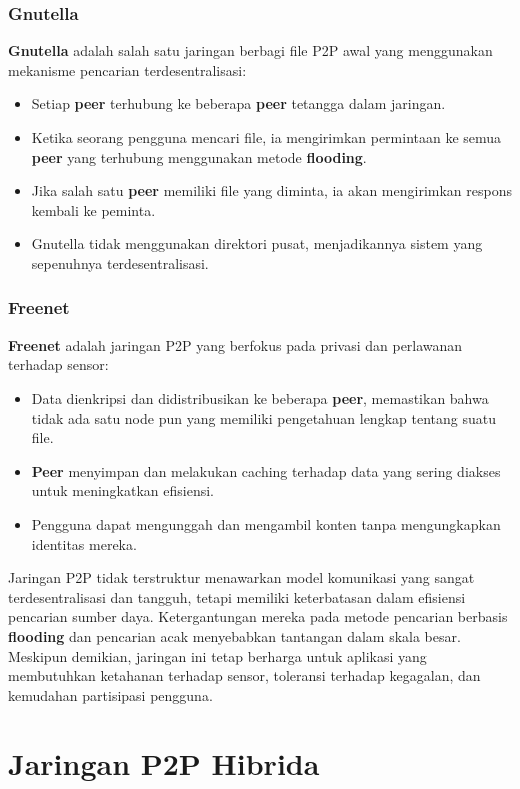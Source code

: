 \subsubsection{Gnutella}
\textbf{Gnutella} adalah salah satu jaringan berbagi file P2P awal yang menggunakan mekanisme pencarian terdesentralisasi:
\begin{itemize}
	\item Setiap \textbf{peer} terhubung ke beberapa \textbf{peer} tetangga dalam jaringan.
	\item Ketika seorang pengguna mencari file, ia mengirimkan permintaan ke semua \textbf{peer} yang terhubung menggunakan metode \textbf{flooding}.
	\item Jika salah satu \textbf{peer} memiliki file yang diminta, ia akan mengirimkan respons kembali ke peminta.
	\item Gnutella tidak menggunakan direktori pusat, menjadikannya sistem yang sepenuhnya terdesentralisasi.
\end{itemize}

\subsubsection{Freenet}
\textbf{Freenet} adalah jaringan P2P yang berfokus pada privasi dan perlawanan terhadap sensor:
\begin{itemize}
	\item Data dienkripsi dan didistribusikan ke beberapa \textbf{peer}, memastikan bahwa tidak ada satu node pun yang memiliki pengetahuan lengkap tentang suatu file.
	\item \textbf{Peer} menyimpan dan melakukan caching terhadap data yang sering diakses untuk meningkatkan efisiensi.
	\item Pengguna dapat mengunggah dan mengambil konten tanpa mengungkapkan identitas mereka.
\end{itemize}

Jaringan P2P tidak terstruktur menawarkan model komunikasi yang sangat terdesentralisasi dan tangguh, tetapi memiliki keterbatasan dalam efisiensi pencarian sumber daya. Ketergantungan mereka pada metode pencarian berbasis \textbf{flooding} dan pencarian acak menyebabkan tantangan dalam skala besar. Meskipun demikian, jaringan ini tetap berharga untuk aplikasi yang membutuhkan ketahanan terhadap sensor, toleransi terhadap kegagalan, dan kemudahan partisipasi pengguna.


\section{Jaringan P2P Hibrida}

